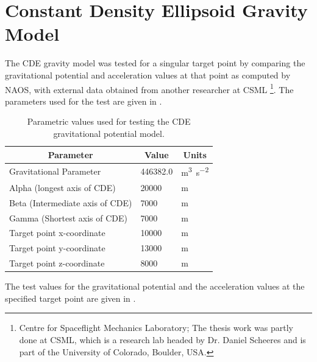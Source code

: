 \section{Constant Density Ellipsoid Gravity Model}
\label{sec:gravity_vv}
The \gls{CDE} gravity model was tested for a singular target point by comparing the gravitational potential and acceleration values at that point as computed by \gls{NAOS}, with external data obtained from another researcher at CSML \footnote{Centre for Spaceflight Mechanics Laboratory; The thesis work was partly done at CSML, which is a research lab headed by Dr. Daniel Scheeres and is part of the University of Colorado, Boulder, USA.}. The parameters used for the test are given in .
\begin{table}[htb]
\centering
\captionsetup{justification=centering}
\caption{Parametric values used for testing the \gls{CDE} gravitational potential model.}
\label{tab:gravity_vv_params}
\begin{tabular}{|l|l|l|}
\hline
\multicolumn{1}{|c|}{\textbf{Parameter}} & \multicolumn{1}{c|}{\textbf{Value}} & \multicolumn{1}{c|}{\textbf{Units}}      \\ \hline
Gravitational Parameter                  & 446382.0                            & \si{\metre \cubed \per \second \squared} \\ \hline
Alpha (longest axis of \gls{CDE})      & 20000                               & \si{\metre}                            \\ \hline
Beta (Intermediate axis of \gls{CDE})  & 7000                                & \si{\metre}                            \\ \hline
Gamma (Shortest axis of \gls{CDE})     & 7000                                & \si{\metre}                            \\ \hline
Target point x-coordinate                & 10000                               & \si{\metre}                            \\ \hline
Target point y-coordinate                & 13000                               & \si{\metre}                            \\ \hline
Target point z-coordinate                & 8000                                & \si{\metre}                            \\ \hline
\end{tabular}
\end{table}
\FloatBarrier
The test values for the gravitational potential and the acceleration values at the specified target point are given in .
